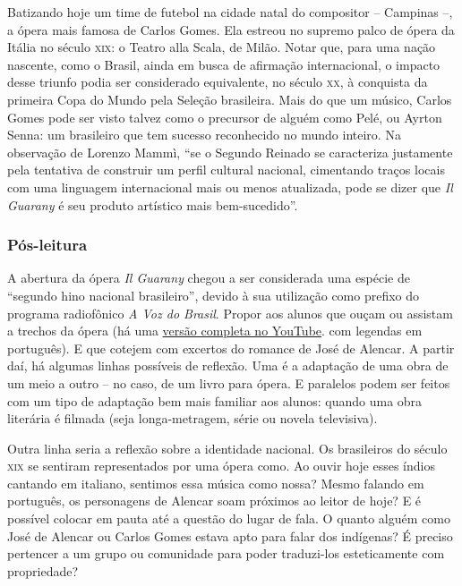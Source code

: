\documentclass[11pt]{extarticle}
\begin{document}
Batizando hoje um time de futebol na cidade natal do compositor – Campinas –, a
ópera mais famosa de Carlos Gomes. Ela estreou no supremo palco de ópera da Itália no
século \textsc{xix}: o Teatro alla Scala, de Milão. Notar que, para uma nação nascente,
como o Brasil, ainda em busca de afirmação internacional, o impacto desse
triunfo podia ser considerado equivalente, no século \textsc{xx}, à conquista da
primeira Copa do Mundo pela Seleção brasileira. Mais do que um músico, Carlos
Gomes pode ser visto talvez como o precursor de alguém como Pelé, ou Ayrton
Senna: um brasileiro que tem sucesso reconhecido no mundo inteiro. Na
observação de Lorenzo Mammì, “se o Segundo Reinado se caracteriza justamente
pela tentativa de construir um perfil cultural nacional, cimentando traços
locais com uma linguagem internacional mais ou menos atualizada, pode se dizer
que \emph{Il Guarany} é seu produto artístico mais bem-sucedido”.

\subsubsection{Pós-leitura}

A abertura da ópera \textit{Il Guarany} chegou a ser considerada uma espécie de
“segundo hino nacional brasileiro”, devido à sua utilização como prefixo do
programa radiofônico \emph{A Voz do Brasil}. Propor aos alunos que ouçam ou assistam a
trechos da ópera  (há uma 
\href{https://www.youtube.com/watch?v=XTIpAyXyvFA&t=3746s}{versão completa no YouTube}. 
com legendas em
português).
E que cotejem
com excertos do romance de José de Alencar. A partir daí, há algumas linhas
possíveis de reflexão. Uma é a adaptação de uma obra de um meio a outro – no
caso, de um livro para ópera. E paralelos podem ser feitos com um tipo de
adaptação bem mais familiar aos alunos: quando uma obra literária é filmada
(seja longa-metragem, série ou novela televisiva). 

  Outra linha seria a reflexão sobre a identidade nacional. Os brasileiros do
século \textsc{xix} se sentiram representados por uma ópera como. Ao ouvir
hoje esses índios cantando em italiano, sentimos essa música como nossa? Mesmo
falando em português, os personagens de Alencar soam próximos ao leitor de
hoje? E é possível colocar em pauta até a questão do lugar de fala. O quanto
alguém como José de Alencar ou Carlos Gomes estava apto para falar dos
indígenas? É preciso pertencer a um grupo ou comunidade para poder traduzi-los
esteticamente com propriedade?
\end{document}
